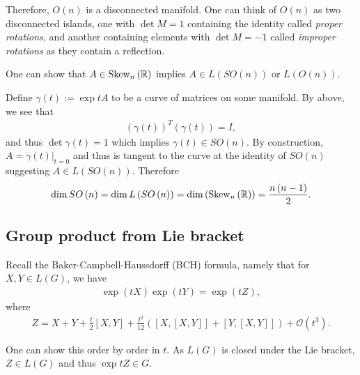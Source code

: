 Therefore, $O \left( n \right) $ is a disconnected manifold. One can think of $O\left( n \right) $ as two disconnected islands, one with $\det M = 1$ containing the identity called \textit{proper rotations}, and another containing elements with $\det M = -1$ called \textit{improper rotations} as they contain a reflection.


One can show that $A \in \text{Skew}_n \left( \mathbb{R} \right) $ implies $A \in L \left( SO \left( n \right)  \right) $ or $L \left( O \left( n \right)  \right) $.

Define $\gamma \left( t \right) := \exp t A$ to be a curve of matrices on some manifold. By above, we see that
\begin{align}
    \left( \gamma \left( t \right)  \right)^{T} \left( \gamma \left( t \right)  \right) = I
,\end{align}
and thus $\det \gamma \left( t \right) = 1$ which implies $\gamma \left( t \right) \in SO \left( n \right) $. By construction, $A = \dot{\gamma}\left( t \right) \bigg|_{t=0}$ and thus is tangent to the curve at the identity of $SO \left( n \right) $ suggesting $A \in L \left( SO \left( n \right)  \right) $. Therefore
\begin{align}
   \dim SO \left( n \right) = \dim L \left( SO \left( n \right)  \right) = \dim \left( \text{Skew}_n \left( \mathbb{R} \right)  \right) = \frac{n \left( n- 1\right) }{2}
.\end{align}


\subsection{Group product from Lie bracket}

Recall the Baker-Campbell-Haussdorff (BCH) formula, namely that for $X,Y \in L \left( G \right) $, we have
\begin{align}
    \exp \left( tX \right) \exp \left( tY \right) = \exp \left( tZ \right) 
,\end{align}
where
\begin{align}
    Z = X + Y + \frac{t}{2}\left[ X, Y \right] + \frac{t^2}{12} \left( \left[ X, \left[ X, Y \right]  \right]   + \left[ Y, \left[ X, Y \right]  \right] \right) + \mathcal{O}\left( t^3 \right) 
.\end{align}

One can show this order by order in $t$. As $L \left( G \right) $ is closed under the Lie bracket, $Z \in L \left( G \right) $ and thus $\exp t Z \in G$.

